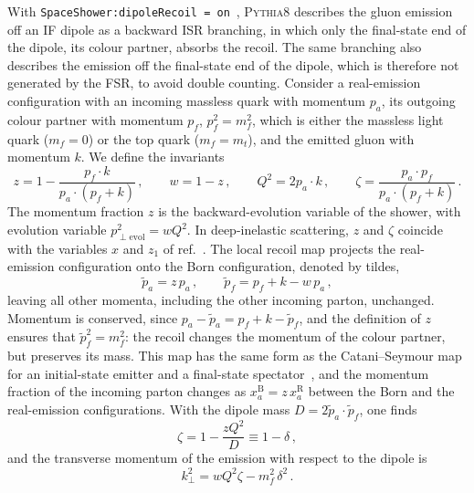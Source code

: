 \documentclass[a4paper,11pt]{article}
\newcommand{\kt}{k_\perp}
\newcommand{\pythia}{\textsc{Pythia8}\xspace}
\newcommand{\code}[1]{\texttt{#1}}
\begin{document}
With \code{SpaceShower:dipoleRecoil = on}~\cite{Cabouat:2017rzi},
\pythia describes the gluon emission off an IF dipole as a backward
ISR branching, in which only the final-state end of the dipole, its
colour partner, absorbs the recoil. The same branching also describes
the emission off the final-state end of the dipole, which is therefore
not generated by the FSR, to avoid double counting. Consider a
real-emission configuration with an incoming massless quark with
momentum $p_a$, its outgoing colour partner with momentum $p_f$,
$p_f^2=m_f^2$, which is either the massless light quark ($m_f=0$) or
the top quark ($m_f=m_t$), and the emitted gluon with momentum $k$. We
define the invariants
\begin{equation}
  z=1-\frac{p_f\cdot k}{p_a\cdot(p_f+k)}\,,\qquad
  w=1-z\,,\qquad
  Q^2=2p_a\cdot k\,,\qquad
  \zeta=\frac{p_a\cdot p_f}{p_a\cdot(p_f+k)}\,.
  \label{eq:invariants}
\end{equation}
The momentum fraction $z$ is the backward-evolution variable of the
shower, with evolution variable $p_{\perp\mathrm{evol}}^2=wQ^2$. In
deep-inelastic scattering, $z$ and $\zeta$ coincide with the
variables $x$ and $z_1$ of ref.~\cite{Cabouat:2017rzi}. The local
recoil map projects the real-emission configuration onto the Born
configuration, denoted by tildes,
\begin{equation}
  \tilde p_a=z\,p_a\,,\qquad
  \tilde p_f=p_f+k-w\,p_a\,,
  \label{eq:projection}
\end{equation}
leaving all other momenta, including the other incoming parton,
unchanged. Momentum is conserved, since $p_a-\tilde p_a=p_f+k-\tilde
p_f$, and the definition of $z$ ensures that $\tilde p_f^2=m_f^2$:
the recoil changes the momentum of the colour partner, but preserves
its mass. This map has the same form as the Catani--Seymour map for an
initial-state emitter and a final-state
spectator~\cite{Catani:1996vz,Catani:2002hc}, and the momentum fraction
of the incoming parton changes as $x_a^{\mathrm{B}}=z\,x_a^{\mathrm{R}}$
between the Born and the real-emission configurations. With the dipole
mass $D=2\tilde p_a\cdot\tilde p_f$, one finds
\begin{equation}
  \zeta=1-\frac{zQ^2}{D}\equiv1-\delta\,,
  \label{eq:zeta}
\end{equation}
and the transverse momentum of the emission with respect to the dipole
is
\begin{equation}
  \kt^2=wQ^2\zeta-m_f^2\,\delta^2\,.
  \label{eq:kt}
\end{equation}
\end{document}
